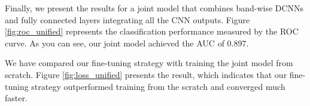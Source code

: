 \documentclass[conference,compsoc]{IEEEtran}
\begin{document}




  Finally, we present the results for a joint model that combines band-wise DCNNs and fully connected layers integrating all the CNN outputs.
  Figure \ref{fig:roc_unified} represents the classification performance measured by the ROC curve. %
  As you can see, our joint model achieved the AUC of $0.897$.

  We have compared our fine-tuning strategy with training the joint model from scratch.
  Figure \ref{fig:loss_unified} presents the result, which indicates that our fine-tuning strategy outperformed training from the scratch and converged much faster.


\end{document}
